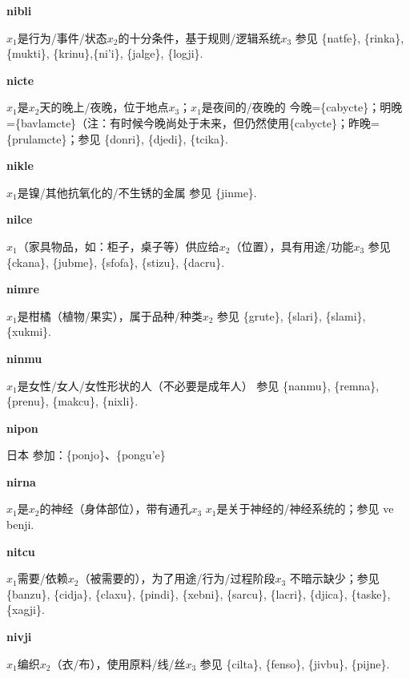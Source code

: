 \documentclass[notitlepage,twocolumn,a4paper,10pt]{book}
\begin{document}
{\sffamily\bfseries nibli}\enspace {\ttfamily\bfseries[nib     ni'i]}  $x_1$是行为\slash{}事件\slash{}状态$x_2$的十分条件，基于规则\slash{}逻辑系统$x_3$ \textemdash{} 参见 \{natfe\}, \{rinka\}, \{mukti\}, \{krinu\},\{ni'i\}, \{jalge\}, \{logji\}.

{\sffamily\bfseries nicte}\enspace {\ttfamily\bfseries[    cte]}  $x_1$是$x_2$天的晚上\slash{}夜晚，位于地点$x_3$；$x_1$是夜间的\slash{}夜晚的 \textemdash{} 今晚=\{cabycte\}；明晚=\{bavlamcte\}（注：有时候今晚尚处于未来，但仍然使用\{cabycte\}；昨晚=\{prulamcte\}；参见 \{donri\}, \{djedi\}, \{tcika\}.

{\sffamily\bfseries nikle}\enspace {\ttfamily\bfseries[nik]}  $x_1$是镍\slash{}其他抗氧化的\slash{}不生锈的金属 \textemdash{} 参见 \{jinme\}.

{\sffamily\bfseries nilce}\enspace {\ttfamily\bfseries[        ni'e]}  $x_1$（家具物品，如：柜子，桌子等）供应给$x_2$（位置），具有用途\slash{}功能$x_3$ \textemdash{} 参见 \{ckana\}, \{jubme\}, \{sfofa\}, \{stizu\}, \{dacru\}.

{\sffamily\bfseries nimre} $x_1$是柑橘（植物\slash{}果实），属于品种\slash{}种类$x_2$ \textemdash{} 参见 \{grute\}, \{slari\}, \{slami\}, \{xukmi\}.

{\sffamily\bfseries ninmu}\enspace {\ttfamily\bfseries[nim     ni'u]}  $x_1$是女性\slash{}女人\slash{}女性形状的人（不必要是成年人） \textemdash{} 参见 \{nanmu\}, \{remna\}, \{prenu\}, \{makcu\}, \{nixli\}.

{\sffamily\bfseries nipon} 日本 \textemdash{} 参加：\{ponjo\}、\{pongu'e\}

{\sffamily\bfseries nirna}\enspace {\ttfamily\bfseries[nir]}  $x_1$是$x_2$的神经（身体部位），带有通孔$x_3$ \textemdash{} $x_1$是关于神经的\slash{}神经系统的；参见 ve {benji}.

{\sffamily\bfseries nitcu}\enspace {\ttfamily\bfseries[    tcu]}  $x_1$需要\slash{}依赖$x_2$（被需要的），为了用途\slash{}行为\slash{}过程阶段$x_3$ \textemdash{} 不暗示缺少；参见 \{banzu\}, \{cidja\}, \{claxu\}, \{pindi\}, \{xebni\}, \{sarcu\}, \{lacri\}, \{djica\}, \{taske\}, \{xagji\}.

{\sffamily\bfseries nivji}\enspace {\ttfamily\bfseries[niv]}  $x_1$编织$x_2$（衣\slash{}布），使用原料\slash{}线\slash{}丝$x_3$ \textemdash{} 参见 \{cilta\}, \{fenso\}, \{jivbu\}, \{pijne\}.
\end{document}
